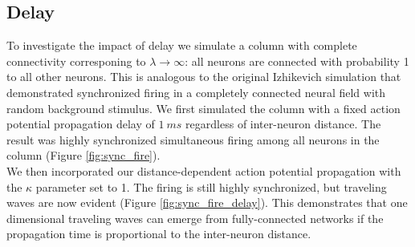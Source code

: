 \documentclass[a4paper,11pt]{article}
\begin{document}
\subsection{Delay} \label{sub:delay}
To investigate the impact of delay we simulate a column with complete connectivity corresponing to $\lambda \rightarrow \infty$: all neurons are connected with probability 1 to all other neurons.
This is analogous to the original Izhikevich simulation \cite{izzy_code} that demonstrated synchronized firing in a completely connected neural field with random background stimulus.
We first simulated the column with a fixed action potential propagation delay of $1~ms$ regardless of inter-neuron distance.
The result was highly synchronized simultaneous firing among all neurons in the column (Figure \ref{fig:sync_fire}). \\ 
We then incorporated our distance-dependent action potential propagation with the $\kappa$ parameter set to 1.
The firing is still highly synchronized, but traveling waves are now evident (Figure \ref{fig:sync_fire_delay}).
This demonstrates that one dimensional traveling waves can emerge from fully-connected networks if the propagation time is proportional to the inter-neuron distance.
\end{document}
